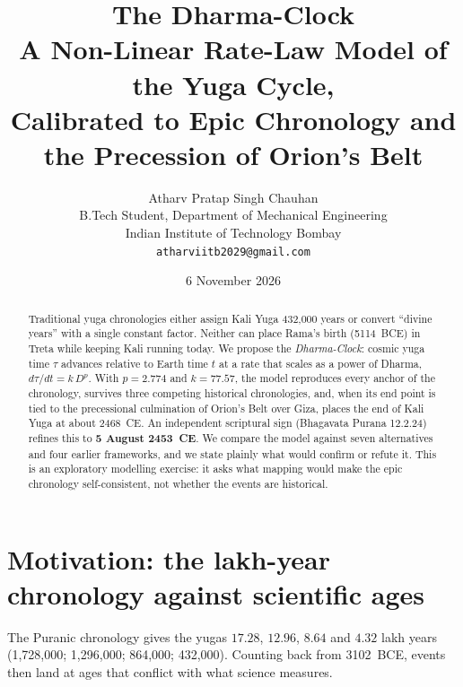 \documentclass[11pt,a4paper]{article}
\title{\textbf{The Dharma-Clock}\\[4pt]
\large A Non-Linear Rate-Law Model of the Yuga Cycle,\\ Calibrated to Epic Chronology and the Precession of Orion's Belt}
\author{Atharv Pratap Singh Chauhan\\[2pt]
\small B.Tech Student, Department of Mechanical Engineering\\
\small Indian Institute of Technology Bombay\\
\small\texttt{atharviitb2029@gmail.com}}
\date{6 November 2026}
\begin{document}
\maketitle

\begin{abstract}
\noindent
Traditional yuga chronologies either assign Kali Yuga 432{,}000 years or convert ``divine years'' with a single constant factor. Neither can place Rama's birth (5114~BCE) in Treta while keeping Kali running today. We propose the \emph{Dharma-Clock}: cosmic yuga time $\tau$ advances relative to Earth time $t$ at a rate that scales as a power of Dharma, $d\tau/dt = k\,D^{p}$. With $p = 2.774$ and $k = 77.57$, the model reproduces every anchor of the chronology, survives three competing historical chronologies, and, when its end point is tied to the precessional culmination of Orion's Belt over Giza, places the end of Kali Yuga at about 2468~CE. An independent scriptural sign (Bhagavata Purana 12.2.24) refines this to \textbf{5 August 2453~CE}. We compare the model against seven alternatives and four earlier frameworks, and we state plainly what would confirm or refute it. This is an exploratory modelling exercise: it asks what mapping would make the epic chronology self-consistent, not whether the events are historical.
\end{abstract}

\section{Motivation: the lakh-year chronology against scientific ages}

The Puranic chronology gives the yugas $17.28$, $12.96$, $8.64$ and $4.32$ lakh years (1{,}728{,}000; 1{,}296{,}000; 864{,}000; 432{,}000). Counting back from 3102~BCE, events then land at ages that conflict with what science measures.
\end{document}
